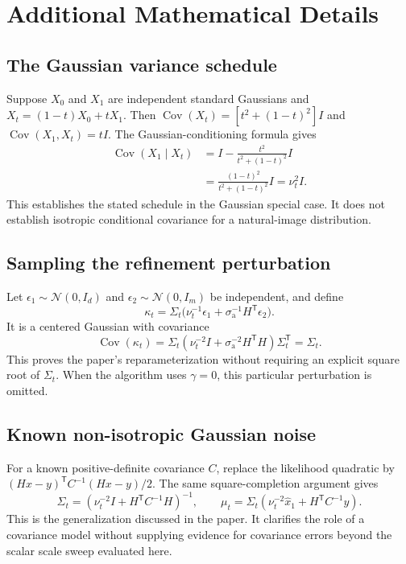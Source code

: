 \documentclass[10pt,letterpaper]{article}
\newcommand{\N}{\mathcal{N}}
\newcommand{\sa}{\sigma_{\mathrm a}}
\newcommand{\xhat}{\widehat{x}_1}
\begin{document}
\appendix
\section{Additional Mathematical Details}\label{app:variance}
\subsection{The Gaussian variance schedule}
Suppose $X_0$ and $X_1$ are independent standard Gaussians and $X_t=(1-t)X_0+tX_1$. Then $\operatorname{Cov}(X_t)=[t^2+(1-t)^2]I$ and $\operatorname{Cov}(X_1,X_t)=tI$. The Gaussian-conditioning formula gives
\begin{align}
 \operatorname{Cov}(X_1\mid X_t)
 &=I-\frac{t^2}{t^2+(1-t)^2}I\\
 &=\frac{(1-t)^2}{t^2+(1-t)^2}I=\nu_t^2I.
\end{align}
This establishes the stated schedule in the Gaussian special case. It does not establish isotropic conditional covariance for a natural-image distribution.

\subsection{Sampling the refinement perturbation}
Let $\epsilon_1\sim\N(0,I_d)$ and $\epsilon_2\sim\N(0,I_m)$ be independent, and define
\begin{equation}
 \kappa_t=\Sigma_t\bigl(\nu_t^{-1}\epsilon_1+\sa^{-1}H^\mathsf{T}\epsilon_2\bigr).
\end{equation}
It is a centered Gaussian with covariance
\begin{equation}
 \operatorname{Cov}(\kappa_t)=\Sigma_t
 (\nu_t^{-2}I+\sa^{-2}H^\mathsf{T}H)\Sigma_t^\mathsf{T}=\Sigma_t.
\end{equation}
This proves the paper's reparameterization without requiring an explicit square root of $\Sigma_t$. When the algorithm uses $\gamma=0$, this particular perturbation is omitted.

\subsection{Known non-isotropic Gaussian noise}
For a known positive-definite covariance $C$, replace the likelihood quadratic by $(Hx-y)^\mathsf{T}C^{-1}(Hx-y)/2$. The same square-completion argument gives
\begin{equation}
 \Sigma_t=(\nu_t^{-2}I+H^\mathsf{T}C^{-1}H)^{-1},\qquad
 \mu_t=\Sigma_t(\nu_t^{-2}\xhat+H^\mathsf{T}C^{-1}y).
\end{equation}
This is the generalization discussed in the paper. It clarifies the role of a covariance model without supplying evidence for covariance errors beyond the scalar scale sweep evaluated here.
\end{document}
